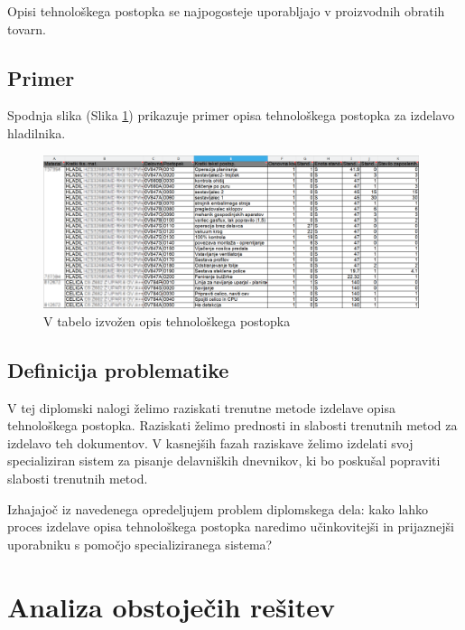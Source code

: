 \documentclass[a4paper, 12pt]{book}
\begin{document}
Opisi tehnološkega postopka se najpogosteje uporabljajo v proizvodnih obratih tovarn.

\subsection{Primer}
Spodnja slika (Slika \ref{sap_2}) prikazuje primer opisa tehnološkega postopka za izdelavo hladilnika.

\begin{figure}[H]
\begin{center}
\includegraphics[width=11cm]{sap_2}
\end{center}
\caption{V tabelo izvožen opis tehnološkega postopka}
\label{sap_2}
\end{figure}



\subsection{Definicija problematike}

V tej diplomski nalogi želimo raziskati trenutne metode izdelave opisa tehnološkega postopka.
Raziskati želimo prednosti in slabosti trenutnih metod za izdelavo teh dokumentov.
V kasnejših fazah raziskave želimo izdelati svoj specializiran sistem za pisanje delavniških dnevnikov, ki bo poskušal popraviti slabosti trenutnih metod.

Izhajajoč iz navedenega opredeljujem problem diplomskega dela: kako lahko proces izdelave opisa tehnološkega postopka naredimo učinkovitejši in prijaznejši uporabniku s pomočjo specializiranega sistema?

\section{Analiza obstoječih rešitev}
\end{document}
